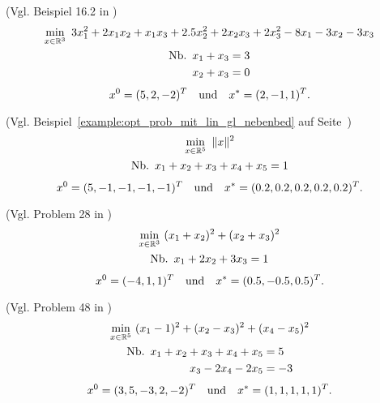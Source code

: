 \begin{testproblem}
(Vgl. Beispiel 16.2 in \cite[S.~452]{nocedal})
\begin{gather}
\min_{x\in\R^3}\ 3 x_1^2 + 2 x_1 x_2 + x_1 x_3 + 2.5 x_2^2 + 2 x_2 x_3 + 2 x_3^2 - 8 x_1 - 3 x_2 - 3 x_3 \notag \\
\begin{split}
\nb x_1 + x_3 & = 3 \\
x_2 + x_3 & = 0 \\
\end{split}
\end{gather}
\begin{equation*}
x^0 = (5, 2, -2)^T \quad\text{und}\quad x^* = (2, -1, 1)^T.
\end{equation*}
\end{testproblem}

\begin{testproblem}
(Vgl. Beispiel~\ref{example:opt_prob_mit_lin_gl_nebenbed} auf Seite~\pageref{example:opt_prob_mit_lin_gl_nebenbed})
\begin{gather}
\min_{x\in\R^5}\ \| x \|^2 \notag \\
\begin{split}
\nb x_1 + x_2 + x_3 + x_4 + x_5 & = 1 \\
\end{split}
\end{gather}
\begin{equation*}
x^0 = (5, -1, -1, -1, -1)^T \quad\text{und}\quad x^* = (0.2, 0.2, 0.2, 0.2, 0.2)^T.
\end{equation*}
\end{testproblem}

\begin{testproblem}
(Vgl. Problem 28 in \cite[S.~51]{hock})
\begin{gather}
\min_{x\in\R^3}\ (x_1 + x_2)^2 + (x_2 + x_3)^2 \notag \\
\begin{split}
\nb x_1 + 2 x_2 + 3 x_3 & = 1 \\
\end{split}
\end{gather}
\begin{equation*}
x^0 = (-4, 1, 1)^T \quad\text{und}\quad x^* = (0.5, -0.5, 0.5)^T.
\end{equation*}
\end{testproblem}

\begin{testproblem}
(Vgl. Problem 48 in \cite[S.~71]{hock})
\begin{gather}
\min_{x\in\R^5}\ (x_1 - 1)^2 + (x_2 - x_3)^2 + (x_4 - x_5)^2 \notag \\
\begin{split}
\nb x_1 + x_2 + x_3 + x_4 + x_5 & = 5 \\
x_3 - 2 x_4 - 2 x_5 & = -3 \\
\end{split}
\end{gather}
\begin{equation*}
x^0 = (3, 5, -3, 2, -2)^T \quad\text{und}\quad x^* = (1, 1, 1, 1, 1)^T.
\end{equation*}
\end{testproblem}

